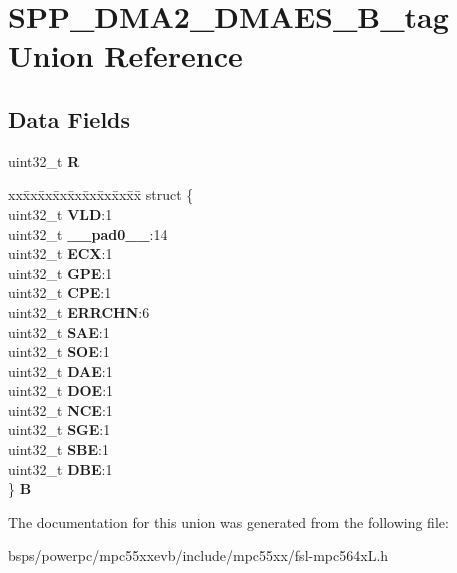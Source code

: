 \hypertarget{unionSPP__DMA2__DMAES__32B__tag}{}\section{S\+P\+P\+\_\+\+D\+M\+A2\+\_\+\+D\+M\+A\+E\+S\+\_\+B\+\_\+tag Union Reference}
\label{unionSPP__DMA2__DMAES__32B__tag}
\subsection*{Data Fields}
\begin{DoxyCompactItemize}
\item 
\mbox{\label{unionSPP__DMA2__DMAES__32B__tag_a96aafe9678a10231e739a3ae49cb53f2}} 
uint32\+\_\+t {\bfseries R}
\item 
\mbox{\label{unionSPP__DMA2__DMAES__32B__tag_a7827597163baca1c59170213991dd6d8}} 
\begin{tabbing}
xx\=xx\=xx\=xx\=xx\=xx\=xx\=xx\=xx\=\kill
struct \{\\
\>uint32\_t {\bfseries VLD}:1\\
\>uint32\_t {\bfseries \_\_pad0\_\_}:14\\
\>uint32\_t {\bfseries ECX}:1\\
\>uint32\_t {\bfseries GPE}:1\\
\>uint32\_t {\bfseries CPE}:1\\
\>uint32\_t {\bfseries ERRCHN}:6\\
\>uint32\_t {\bfseries SAE}:1\\
\>uint32\_t {\bfseries SOE}:1\\
\>uint32\_t {\bfseries DAE}:1\\
\>uint32\_t {\bfseries DOE}:1\\
\>uint32\_t {\bfseries NCE}:1\\
\>uint32\_t {\bfseries SGE}:1\\
\>uint32\_t {\bfseries SBE}:1\\
\>uint32\_t {\bfseries DBE}:1\\
\} {\bfseries B}\\

\end{tabbing}\end{DoxyCompactItemize}


The documentation for this union was generated from the following file\+:\begin{DoxyCompactItemize}
\item 
bsps/powerpc/mpc55xxevb/include/mpc55xx/fsl-\/mpc564x\+L.\+h\end{DoxyCompactItemize}
